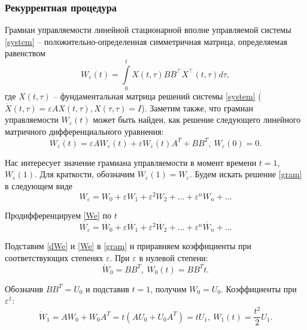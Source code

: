 \documentclass[../main.tex]{subfiles}
\begin{document}
 \subsubsection{Рекуррентная процедура}
 Грамиан управляемости линейной стационарной вполне управляемой системы \eqref{system} -- положительно-определенная симметричная матрица, определяемая равенством
 \begin{equation*}
	 W_{\varepsilon}(t) = \int \limits_0^t X(t,\tau) B B^{\top} X^{\top}(t,\tau) d\tau,
 \end{equation*}
 где $ X(t,\tau) $ -- фундаментальная матрица решений системы \eqref{system} ($  \dot{X}(t,\tau) = \varepsilon A X(t,\tau), X(\tau,\tau) = I  $).
 Заметим также, что грамиан управляемости $ W_{\varepsilon}(t) $ может быть найден, как решение следующего линейного матричного дифференциального уравнения:
 \begin{equation}\label{gram}
	 \dot{W_{\varepsilon}}(t) = \varepsilon A W_{\varepsilon}(t) + \varepsilon W_{\varepsilon}(t) A^T + BB^T, \ W_{\varepsilon}(0) = 0.
 \end{equation}
 
 Нас интересует значение грамиана управляемости в момент времени $ t = 1$, $ W_{\varepsilon}(1) $. Для краткости, обозначим $ W_{\varepsilon}(1) = W_{\varepsilon} $.
 Будем искать решение \eqref{gram} в следующем виде
 \begin{equation}\label{We}
	 W_{\varepsilon} = W_0 + \varepsilon W_1 + \varepsilon^2 W_2 + \dots + \varepsilon^n W_n + \dots 
 \end{equation}
 
 Продифференцируем \eqref{We} по $ t $
 \begin{equation}\label{dWe}
	 \dot{W_{\varepsilon}} = \dot{W_0} + \varepsilon \dot{W_1} + \varepsilon^2 \dot{W_2} + \dots + \varepsilon^n \dot{W_n} + \dots 
 \end{equation}
 
 Подставим \eqref{dWe} и \eqref{We} в \eqref{gram} и приравняем коэффициенты при соответствующих степенях $ \varepsilon $. При $ \varepsilon $ в нулевой степени:
 \begin{equation*}
	 \dot{W}_0 = B B ^T,  \ W_0(t) = B B ^Tt.
 \end{equation*}
 
 Обозначив $ B B^T = U_0 $ и подставив $ t = 1$, получим $ W_0 = U_0$. Коэффициенты при $ \varepsilon ^ 1$:
 \begin{equation*}
	 \dot{W}_1 = A W_0 + W_0 A^T = t \left( A U_0 + U_0 A^T \right) = t U_1 ,  \ W_1(t) = \frac{t^2}{2}U_1.
 \end{equation*}
 
\end{document}

